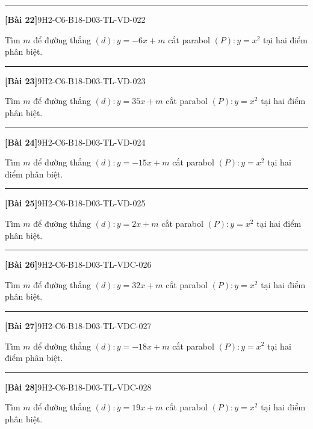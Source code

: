 \documentclass[12pt,a4paper]{article}
\newif\ifloigiai
\newenvironment{cauhoi}[2]{%
  \par\medskip\noindent\rule{\textwidth}{0.4pt}\par\nopagebreak
  \noindent\textbf{[#1]}\hfill{\scriptsize\ttfamily #2}\par\nopagebreak\smallskip}{\par}
\newcommand{\loigiai}[1]{\ifloigiai\par\smallskip\noindent\textit{Lời giải.} #1\par\fi}
\begin{document}
\begin{cauhoi}{Bài 22}{9H2-C6-B18-D03-TL-VD-022}
Tìm $m$ để đường thẳng $(d): y=-6x+m$ cắt parabol $(P): y=x^{2}$ tại hai điểm phân biệt.
\loigiai{Phương trình hoành độ giao điểm $x^{2}+6x-m=0$. Để $(d)$ cắt $(P)$ tại hai điểm phân biệt cần $\Delta=36+4m>0$, suy ra $m>-9$.}
\end{cauhoi}
\begin{cauhoi}{Bài 23}{9H2-C6-B18-D03-TL-VD-023}
Tìm $m$ để đường thẳng $(d): y=35x+m$ cắt parabol $(P): y=x^{2}$ tại hai điểm phân biệt.
\loigiai{Phương trình hoành độ giao điểm $x^{2}-35x-m=0$. Để $(d)$ cắt $(P)$ tại hai điểm phân biệt cần $\Delta=1225+4m>0$, suy ra $m>-\dfrac{1225}{4}$.}
\end{cauhoi}
\begin{cauhoi}{Bài 24}{9H2-C6-B18-D03-TL-VD-024}
Tìm $m$ để đường thẳng $(d): y=-15x+m$ cắt parabol $(P): y=x^{2}$ tại hai điểm phân biệt.
\loigiai{Phương trình hoành độ giao điểm $x^{2}+15x-m=0$. Để $(d)$ cắt $(P)$ tại hai điểm phân biệt cần $\Delta=225+4m>0$, suy ra $m>-\dfrac{225}{4}$.}
\end{cauhoi}
\begin{cauhoi}{Bài 25}{9H2-C6-B18-D03-TL-VD-025}
Tìm $m$ để đường thẳng $(d): y=2x+m$ cắt parabol $(P): y=x^{2}$ tại hai điểm phân biệt.
\loigiai{Phương trình hoành độ giao điểm $x^{2}-2x-m=0$. Để $(d)$ cắt $(P)$ tại hai điểm phân biệt cần $\Delta=4+4m>0$, suy ra $m>-1$.}
\end{cauhoi}
\begin{cauhoi}{Bài 26}{9H2-C6-B18-D03-TL-VDC-026}
Tìm $m$ để đường thẳng $(d): y=32x+m$ cắt parabol $(P): y=x^{2}$ tại hai điểm phân biệt.
\loigiai{Phương trình hoành độ giao điểm $x^{2}-32x-m=0$. Để $(d)$ cắt $(P)$ tại hai điểm phân biệt cần $\Delta=1024+4m>0$, suy ra $m>-256$.}
\end{cauhoi}
\begin{cauhoi}{Bài 27}{9H2-C6-B18-D03-TL-VDC-027}
Tìm $m$ để đường thẳng $(d): y=-18x+m$ cắt parabol $(P): y=x^{2}$ tại hai điểm phân biệt.
\loigiai{Phương trình hoành độ giao điểm $x^{2}+18x-m=0$. Để $(d)$ cắt $(P)$ tại hai điểm phân biệt cần $\Delta=324+4m>0$, suy ra $m>-81$.}
\end{cauhoi}
\begin{cauhoi}{Bài 28}{9H2-C6-B18-D03-TL-VDC-028}
Tìm $m$ để đường thẳng $(d): y=19x+m$ cắt parabol $(P): y=x^{2}$ tại hai điểm phân biệt.
\loigiai{Phương trình hoành độ giao điểm $x^{2}-19x-m=0$. Để $(d)$ cắt $(P)$ tại hai điểm phân biệt cần $\Delta=361+4m>0$, suy ra $m>-\dfrac{361}{4}$.}
\end{cauhoi}
\end{document}
